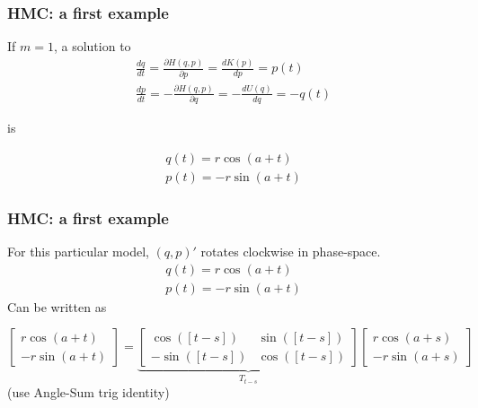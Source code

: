 \documentclass{beamer}
\begin{document}
\begin{frame}
\frametitle{HMC: a first example}

If $m=1$, a solution to
\begin{gather}
\frac{dq}{dt} = \frac{\partial H(q,p)}{\partial p} =  \frac{d K(p) }{d p} = p(t) \\
\frac{dp}{dt} = -\frac{\partial H(q,p)}{\partial q} = -\frac{d U(q)}{d q} = -q(t)
\end{gather}

is


\begin{gather}
q(t) = r \cos(a + t)\\
p(t) = -r \sin(a + t)
\end{gather}


\end{frame}

\begin{frame}
\frametitle{HMC: a first example}

For this particular model, $(q,p)'$ rotates clockwise in phase-space.
\begin{gather}
q(t) = r \cos(a + t)\\
p(t) = -r \sin(a + t)
\end{gather}
Can be written as 

$$
\left[\begin{array}{c}
r \cos(a + t) \\
-r \sin(a + t) 
\end{array}\right]
=
\underbrace{
\left[\begin{array}{cc}
\cos([t-s]) & \sin([t-s]) \\
-\sin([t-s])  & \cos([t-s])
\end{array}\right]}
_{T_{t-s}}
\left[\begin{array}{c}
r \cos(a + s) \\
-r \sin(a + s) 
\end{array}\right]
$$
(use Angle-Sum trig identity)
\end{frame}
\end{document}
